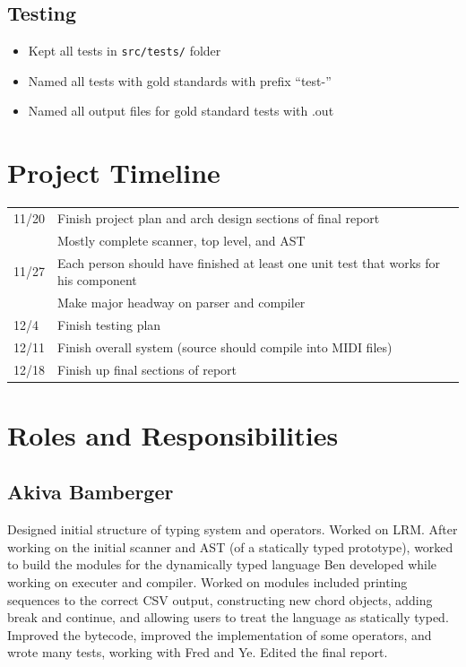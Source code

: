 \documentclass[12pt,A4]{book}
\begin{document}
\subsection{Testing}
\begin{itemize}
\item Kept all tests in \verb|src/tests/| folder
\item Named all tests with gold standards with prefix ``test-''
\item Named all output files for gold standard tests with .out
\end{itemize}
\section{Project Timeline}
\begin{tabular}{l p{}}
11/20 & Finish project plan and arch design sections of final report\\
      & Mostly complete scanner, top level, and AST\\
11/27 & Each person should have finished at least one unit test that works for his component\\
      & Make major headway on parser and compiler\\
12/4 & Finish testing plan\\
12/11 & Finish overall system (source should compile into MIDI files)\\
12/18 & Finish up final sections of report\\
\end{tabular}
\section{Roles and Responsibilities}
\subsection{Akiva Bamberger}
Designed initial structure of typing system and operators. Worked on LRM. After working on the initial scanner and AST (of a statically typed prototype), worked to build the modules for the dynamically typed language Ben developed while working on executer and compiler. Worked on modules included printing sequences to the correct CSV output, constructing new chord objects, adding break and continue, and allowing users to treat the language as statically typed. Improved the bytecode, improved the implementation of some operators, and wrote many tests, working with Fred and Ye. Edited the final report.
\end{document}
